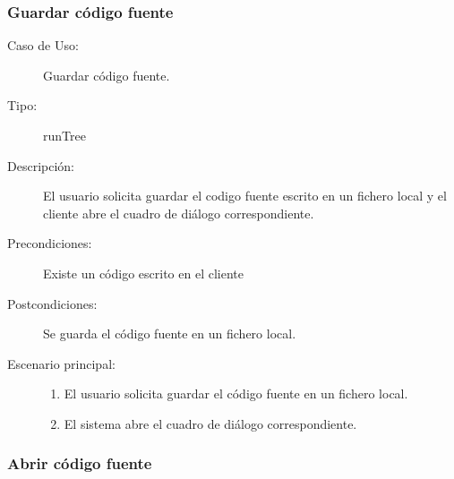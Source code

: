 \subsubsection{Guardar código fuente} 

\begin{description}
   \item[Caso de Uso:] Guardar código fuente.
   \item [Tipo:] runTree
   \item[Descripción:] 
   El usuario solicita guardar el codigo fuente escrito en un fichero local y el cliente
   abre el cuadro de diálogo correspondiente.
   \item[Precondiciones:]
   Existe un código escrito en el cliente 
   \item[Postcondiciones:] 
   Se guarda el código fuente en un fichero local.
   \item[Escenario principal:] \hfill
   \begin{enumerate}
   \item El usuario solicita guardar el código fuente en un fichero local.
   \item El sistema abre el cuadro de diálogo correspondiente.
   \end{enumerate}
\end{description}


\subsubsection{Abrir código fuente} 

